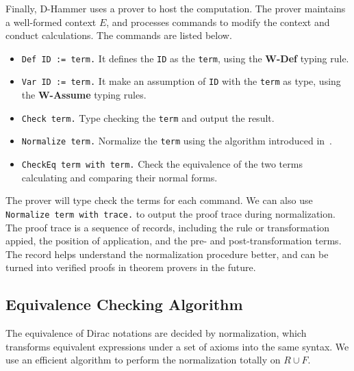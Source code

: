 Finally, D-Hammer uses a prover to host the computation. The prover maintains a well-formed context $E$, and processes commands to modify the context and conduct calculations. The commands are listed below.
\begin{itemize}
    \item \texttt{\textcolor{NavyBlue}{Def} ID := term.} It defines the \texttt{ID} as the \texttt{term}, using the \textbf{W-Def} typing rule.
    \item \texttt{\textcolor{NavyBlue}{Var} ID := term.} It make an assumption of \texttt{ID} with the \texttt{term} as type, using the \textbf{W-Assume} typing rules.
    \item \texttt{\textcolor{NavyBlue}{Check} term.} Type checking the \texttt{term} and output the result.
    \item \texttt{\textcolor{NavyBlue}{Normalize} term.} Normalize the \texttt{term} using the algorithm introduced in~.
    \item \texttt{\textcolor{NavyBlue}{CheckEq} term \textcolor{NavyBlue}{with} term.} Check the equivalence of the two terms calculating and comparing their normal forms.
\end{itemize}
The prover will type check the terms for each command. We can also use \texttt{\textcolor{NavyBlue}{Normalize} term \textcolor{NavyBlue}{with trace}.} to output the proof trace during normalization. The proof trace is a sequence of records, including the rule or transformation appied, the position of application, and the pre- and post-transformation terms. The record helps understand the normalization procedure better, and can be turned into verified proofs in theorem provers in the future.

\subsection{Equivalence Checking Algorithm}

The equivalence of Dirac notations are decided by normalization, which transforms equivalent expressions under a set of axioms into the same syntax. We use an efficient algorithm to perform the normalization totally on $R \cup F$.


